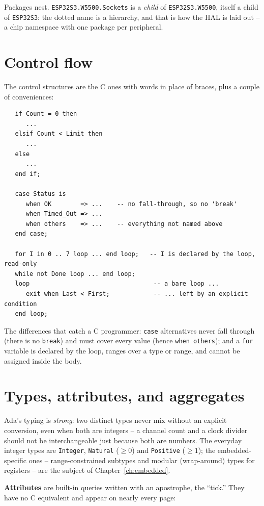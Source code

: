 Packages nest. \texttt{ESP32S3.W5500.Sockets} is a \emph{child} of
\texttt{ESP32S3.W5500}, itself a child of \texttt{ESP32S3}: the dotted name is a
hierarchy, and that is how the HAL is laid out -- a chip namespace with one package
per peripheral.

\section{Control flow}

The control structures are the C ones with words in place of braces, plus a couple
of conveniences:

\begin{lstlisting}
   if Count = 0 then
      ...
   elsif Count < Limit then
      ...
   else
      ...
   end if;

   case Status is
      when OK        => ...    -- no fall-through, so no 'break'
      when Timed_Out => ...
      when others    => ...    -- everything not named above
   end case;

   for I in 0 .. 7 loop ... end loop;   -- I is declared by the loop, read-only
   while not Done loop ... end loop;
   loop                                  -- a bare loop ...
      exit when Last < First;            -- ... left by an explicit condition
   end loop;
\end{lstlisting}

The differences that catch a C programmer: \texttt{case} alternatives never fall
through (there is no \texttt{break}) and must cover every value (hence
\texttt{when others}); and a \texttt{for} variable is declared by the loop, ranges
over a type or range, and cannot be assigned inside the body.

\section{Types, attributes, and aggregates}

Ada's typing is \emph{strong}: two distinct types never mix without an explicit
conversion, even when both are integers -- a channel count and a clock divider
should not be interchangeable just because both are numbers. The everyday integer
types are \texttt{Integer}, \texttt{Natural} ($\geq 0$) and \texttt{Positive}
($\geq 1$); the embedded-specific ones -- range-constrained subtypes and modular
(wrap-around) types for registers -- are the subject of Chapter~\ref{ch:embedded}.

\textbf{Attributes} are built-in queries written with an apostrophe, the ``tick.''
They have no C equivalent and appear on nearly every page:

